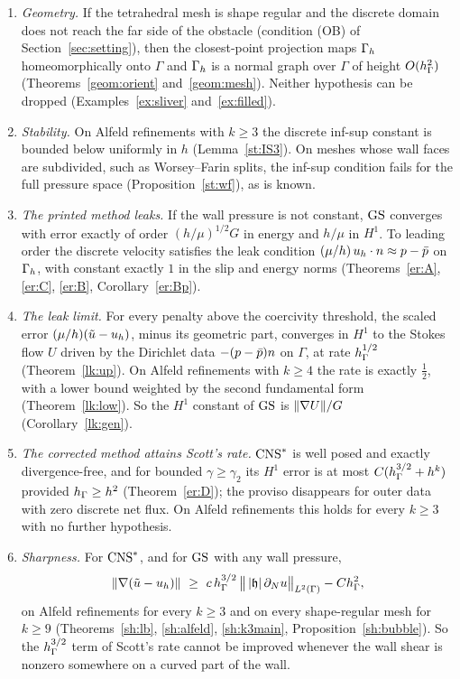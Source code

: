 \begin{enumerate}[label=\textbf{\arabic*.},leftmargin=1.6em]
\item \emph{Geometry.} If the tetrahedral mesh is shape regular and the discrete domain does not reach the far side of the obstacle (condition (OB) of Section~\ref{sec:setting}), then the closest-point projection maps $\Gamma_h$ homeomorphically onto $\Gamma$ and $\Gamma_h$ is a normal graph over $\Gamma$ of height $O(h_\Gamma^2)$ (Theorems~\ref{geom:orient} and~\ref{geom:mesh}). Neither hypothesis can be dropped (Examples~\ref{ex:sliver} and~\ref{ex:filled}).
\item \emph{Stability.} On Alfeld refinements with $k\ge3$ the discrete inf-sup constant is bounded below uniformly in $h$ (Lemma~\ref{st:IS3}). On meshes whose wall faces are subdivided, such as Worsey--Farin splits, the inf-sup condition fails for the full pressure space (Proposition~\ref{st:wf}), as is known.
\item \emph{The printed method leaks.} If the wall pressure is not constant, $\mathrm{GS}$ converges with error exactly of order $(h/\mu)^{1/2}G$ in energy and $h/\mu$ in $H^1$. To leading order the discrete velocity satisfies the leak condition $(\mu/h)\,u_h\cdot n\approx p-\bar p$ on $\Gamma_h$, with constant exactly $1$ in the slip and energy norms (Theorems~\ref{er:A}, \ref{er:C}, \ref{er:B}, Corollary~\ref{er:Bp}).
\item \emph{The leak limit.} For every penalty above the coercivity threshold, the scaled error $(\mu/h)(\tilde u-u_h)$, minus its geometric part, converges in $H^1$ to the Stokes flow $U$ driven by the Dirichlet data $-(p-\bar p)n$ on $\Gamma$, at rate $h_\Gamma^{1/2}$ (Theorem~\ref{lk:up}). On Alfeld refinements with $k\ge4$ the rate is exactly $\frac12$, with a lower bound weighted by the second fundamental form (Theorem~\ref{lk:low}). So the $H^1$ constant of $\mathrm{GS}$ is $\lVert \nabla U\rVert/G$ (Corollary~\ref{lk:gen}).
\item \emph{The corrected method attains Scott's rate.} $\mathrm{CNS}^\ast$ is well posed and exactly divergence-free, and for bounded $\gamma\ge\gamma_2$ its $H^1$ error is at most $C(h_\Gamma^{3/2}+h^k)$ provided $h_\Gamma\ge h^2$ (Theorem~\ref{er:D}); the proviso disappears for outer data with zero discrete net flux. On Alfeld refinements this holds for every $k\ge3$ with no further hypothesis.
\item \emph{Sharpness.} For $\mathrm{CNS}^\ast$, and for $\mathrm{GS}$ with any wall pressure,
\[
\norm{\nabla(\ut-u_h)}\ \ge\ c\,\hG^{3/2}\,\bigl\|\,|\hh|\,\partial_Nu\bigr\|_{L^2(\Gamma)}-C\hG^2,
\]
on Alfeld refinements for every $k\ge3$ and on every shape-regular mesh for $k\ge9$ (Theorems~\ref{sh:lb}, \ref{sh:alfeld}, \ref{sh:k3main}, Proposition~\ref{sh:bubble}). So the $h_\Gamma^{3/2}$ term of Scott's rate cannot be improved whenever the wall shear is nonzero somewhere on a curved part of the wall.

\end{enumerate}
